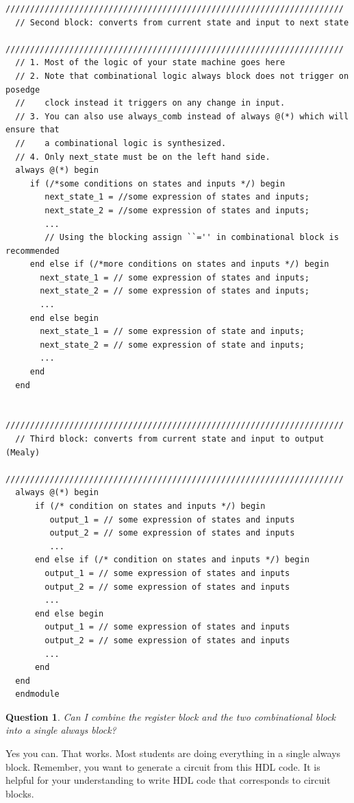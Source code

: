 \documentclass{article}
\newtheorem{question}{Question}
\begin{document}
\begin{lstlisting}[style=verilog-style,frame=ltrb]
  /////////////////////////////////////////////////////////////////////
  // Second block: converts from current state and input to next state
  /////////////////////////////////////////////////////////////////////
  // 1. Most of the logic of your state machine goes here
  // 2. Note that combinational logic always block does not trigger on posedge
  //    clock instead it triggers on any change in input.
  // 3. You can also use always_comb instead of always @(*) which will ensure that
  //    a combinational logic is synthesized.
  // 4. Only next_state must be on the left hand side.
  always @(*) begin
     if (/*some conditions on states and inputs */) begin
        next_state_1 = //some expression of states and inputs;
        next_state_2 = //some expression of states and inputs;
        ...
        // Using the blocking assign ``='' in combinational block is recommended
     end else if (/*more conditions on states and inputs */) begin
       next_state_1 = // some expression of states and inputs;
       next_state_2 = // some expression of states and inputs;
       ...
     end else begin
       next_state_1 = // some expression of state and inputs;
       next_state_2 = // some expression of state and inputs;
       ...
     end
  end

  /////////////////////////////////////////////////////////////////////
  // Third block: converts from current state and input to output (Mealy)
  /////////////////////////////////////////////////////////////////////
  always @(*) begin
      if (/* condition on states and inputs */) begin
         output_1 = // some expression of states and inputs
         output_2 = // some expression of states and inputs
         ...
      end else if (/* condition on states and inputs */) begin
        output_1 = // some expression of states and inputs
        output_2 = // some expression of states and inputs
        ...
      end else begin
        output_1 = // some expression of states and inputs
        output_2 = // some expression of states and inputs
        ...
      end 
  end
  endmodule
\end{lstlisting}

\begin{question}
  Can I combine the register block and the two combinational block into a single
  always block?
\end{question}
Yes you can. That works. Most students are doing everything in a single always
block. Remember, you want to generate a circuit from this HDL code. It is helpful for your
understanding to write HDL code that corresponds to circuit blocks.
\end{document}
